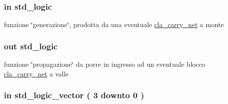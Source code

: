 \subsubsection[{\texorpdfstring{genin}{genin}}]{ {\bfseries \textcolor{vhdlchar}{in}\textcolor{vhdlchar}{ }} {\bfseries \textcolor{vhdlchar}{std\+\_\+logic}\textcolor{vhdlchar}{ }} \hspace{0.3cm}{\ttfamily [Port]}}\hypertarget{group___carry_network_ga0a46d5193cb73eb993bc5d4f69741d0a}{}\label{group___carry_network_ga0a46d5193cb73eb993bc5d4f69741d0a}


funzione \char`\"{}generazione\char`\"{}, prodotta da una eventuale \hyperlink{classcla__carry__net}{cla\+\_\+carry\+\_\+net} a monte 

\subsubsection[{\texorpdfstring{genout}{genout}}]{ {\bfseries \textcolor{vhdlchar}{out}\textcolor{vhdlchar}{ }} {\bfseries \textcolor{vhdlchar}{std\+\_\+logic}\textcolor{vhdlchar}{ }} \hspace{0.3cm}{\ttfamily [Port]}}\hypertarget{group___carry_network_ga068cd5c4d23e284cb942702252ed1491}{}\label{group___carry_network_ga068cd5c4d23e284cb942702252ed1491}
funzione \char`\"{}propagazione\char`\"{} da porre in ingresso ad un eventuale blocco \hyperlink{classcla__carry__net}{cla\+\_\+carry\+\_\+net} a valle 
\subsubsection[{\texorpdfstring{prop}{prop}}]{ {\bfseries \textcolor{vhdlchar}{in}\textcolor{vhdlchar}{ }} {\bfseries \textcolor{vhdlchar}{std\+\_\+logic\+\_\+vector}\textcolor{vhdlchar}{ }\textcolor{vhdlchar}{(}\textcolor{vhdlchar}{ }\textcolor{vhdlchar}{ } \textcolor{vhdldigit}{3} \textcolor{vhdlchar}{ }\textcolor{vhdlchar}{downto}\textcolor{vhdlchar}{ }\textcolor{vhdlchar}{ } \textcolor{vhdldigit}{0} \textcolor{vhdlchar}{ }\textcolor{vhdlchar}{)}\textcolor{vhdlchar}{ }} \hspace{0.3cm}{\ttfamily [Port]}}\hypertarget{group___carry_network_gac1f84cd3374a5a4d2ee2669ebdadafe8}{}\label{group___carry_network_gac1f84cd3374a5a4d2ee2669ebdadafe8}
